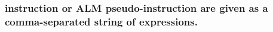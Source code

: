 \subsubsection{instruction or ALM pseudo-instruction are given as a comma-separated string of expressions.}

